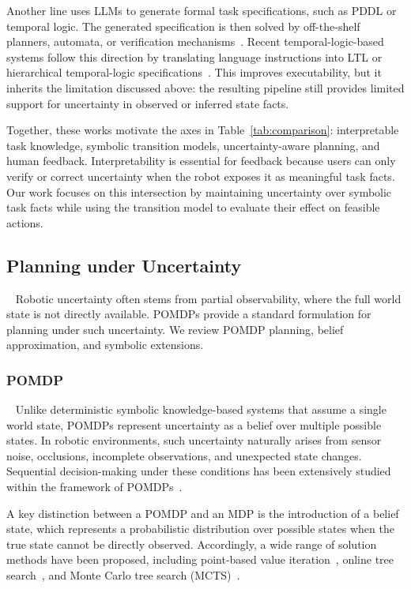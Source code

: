 Another line uses LLMs to generate formal task specifications, such as PDDL or temporal logic. The generated specification is then solved by off-the-shelf planners, automata, or verification mechanisms~\cite{huang2023voxposer,dai2024optimal,liu2025delta,paulius2025bootstrapping,quartey2025verifiably}. Recent temporal-logic-based systems follow this direction by translating language instructions into LTL or hierarchical temporal-logic specifications~\cite{xu2025nl2hltl2plan,rabiei2025ltlcodegen,wu2025selp,li2025automatic,hu2026llm}. This improves executability, but it inherits the limitation discussed above: the resulting pipeline still provides limited support for uncertainty in observed or inferred state facts. 

Together, these works motivate the axes in Table~\ref{tab:comparison}: interpretable task knowledge, symbolic transition models, uncertainty-aware planning, and human feedback. Interpretability is essential for feedback because users can only verify or correct uncertainty when the robot exposes it as meaningful task facts. Our work focuses on this intersection by maintaining uncertainty over symbolic task facts while using the transition model to evaluate their effect on feasible actions.

\subsection{Planning under Uncertainty}~\label{rel:PlanningUncertainty}
Robotic uncertainty often stems from partial observability, where the full world state is not directly available. POMDPs provide a standard formulation for planning under such uncertainty. We review POMDP planning, belief approximation, and symbolic extensions.

\subsubsection{POMDP}~\label{rel:pu_pomdp}
Unlike deterministic symbolic knowledge-based systems that assume a single world state, POMDPs represent uncertainty as a belief over multiple possible states. In robotic environments, such uncertainty naturally arises from sensor noise, occlusions, incomplete observations, and unexpected state changes. Sequential decision-making under these conditions has been extensively studied within the framework of POMDPs~\cite{somani2013despot,bai2015intention,cramer2021probabilistic,bravo2019use}.


A key distinction between a POMDP and an MDP is the introduction of a belief state, which represents a probabilistic distribution over possible states when the true state cannot be directly observed. Accordingly, a wide range of solution methods have been proposed, including point-based value iteration~\cite{pineau2003point}, online tree search~\cite{ross2008online}, and Monte Carlo tree search (MCTS)~\cite{silver2010monte}.


